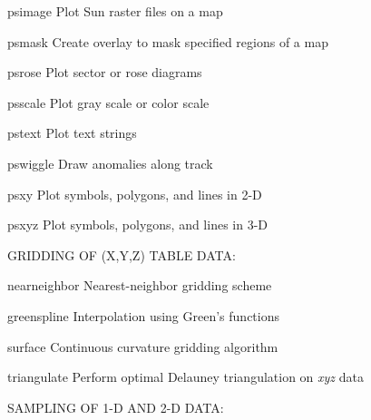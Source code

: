 \documentclass{article}
\begin{document}
\par 	psimage	Plot Sun raster files on a map\par 

\par 	psmask	Create overlay to mask specified regions of a map\par 

\par 	psrose	Plot sector or rose diagrams\par 

\par 	psscale	Plot gray scale or color scale\par 

\par 	pstext	Plot text strings\par 

\par 	pswiggle	Draw anomalies along track\par 

\par 	psxy	Plot symbols, polygons, and lines in 2-D\par 

\par 	psxyz	Plot symbols, polygons, and lines in 3-D\par 

\par \par 

\par GRIDDING OF (X,Y,Z) TABLE DATA:\par 

\par 	nearneighbor	Nearest-neighbor gridding scheme\par 

\par 	greenspline	Interpolation using Green's functions\par 

\par 	surface	Continuous curvature gridding algorithm\par 

\par 	triangulate	Perform optimal Delauney triangulation on {\it xyz} data\par 

\par \par 

\par SAMPLING OF 1-D AND 2-D DATA:\par 
\end{document}
